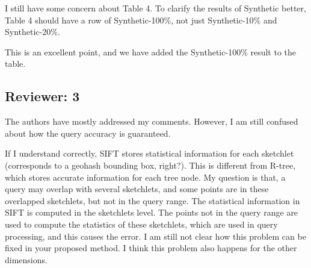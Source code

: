 \documentclass{article}
\begin{document}
I still have some concern about Table 4. To clarify the results of Synthetic better, Table 4 should have a row of Synthetic-100\%, not just Synthetic-10\% and Synthetic-20\%.

\begin{tcolorbox}
    This is an excellent point, and we have added the Synthetic-100\% result to the table.
\end{tcolorbox}

\vspace{1em}

\subsection*{Reviewer: 3}\label{reviewer-3}

The authors have mostly addressed my comments. However, I am still confused about how the query accuracy is guaranteed.

If I understand correctly, SIFT stores statistical information for each sketchlet (corresponds to a geohash bounding box, right?). This is different from R-tree, which stores accurate information for each tree node. My question is that, a query may overlap with several sketchlets, and some points are in these overlapped sketchlets, but not in the query range. The statistical information in SIFT is computed in the sketchlets level. The points not in the query range are used to compute the statistics of these sketchlets, which are used in query processing, and this causes the error. I am still not clear how this problem can be fixed in your proposed method. I think this problem also happens for the other dimensions.
\end{document}
